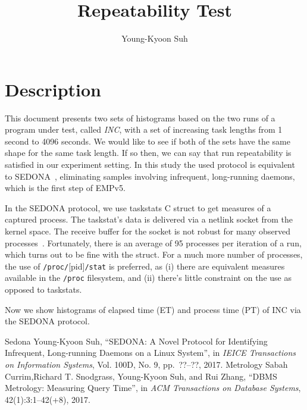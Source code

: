 \documentclass[10pt]{article}
\begin{document}
\title{Repeatability Test}

\author{
Young-Kyoon Suh\\
}
\maketitle

\section{Description}
This document presents two sets of histograms based on the two runs 
of a program under test, called {\em INC}, with a set of increasing task lengths 
from 1 second to 4096 seconds.
We would like to see if both of the sets have the same shape for the same task length.
If so then, we can say that run repeatability is satisfied in our experiment setting. 
In this study the used protocol is equivalent to SEDONA~\cite{Sedona}, 
eliminating samples involving infrequent, long-running daemons, which is the first step of EMPv5.

In the SEDONA protocol, we use taskstats C struct to get measures of a captured process. 
The taskstat's data is delivered via a netlink socket from the kernel space. 
The receive buffer for the socket is not robust for many observed processes~\cite{Metrology}. 
Fortunately, there is an average of 95 processes per iteration of a run, 
which turns out to be fine with the struct. 
For a much more number of processes, 
the use of  {\tt /proc/}[pid]{\tt{/stat}} is preferred, 
as (i) there are equivalent measures available in the {\tt /proc} filesystem, 
and (ii) there's little constraint on the use as opposed to taskstats. 

Now we show histograms of elapsed time (ET) and process time (PT) of INC via the SEDONA protocol.

\pagebreak



\pagebreak
\newpage



\pagebreak
\newpage



\pagebreak
\newpage



\pagebreak
\newpage




\newcommand{\etalchar}[1]{$^{#1}$}
\begin{thebibliography}{99}
\vspace{0.1em}
\bibitem
{Sedona}
Young-Kyoon Suh, ``SEDONA: A Novel Protocol for Identifying Infrequent, Long-running Daemons on a Linux System'', in {\em IEICE Transactions on Information Systems}, Vol. 100D, No. 9, pp.~??--??, 2017.
\vspace{0.1em}
\bibitem
{Metrology}
Sabah Currim,Richard T. Snodgrass, Young-Kyoon Suh, and Rui Zhang, ``DBMS Metrology: Measuring Query Time'', in {\em ACM Transactions on Database Systems}, 42(1):3:1--42(+8), 2017.
\end{thebibliography}
\end{document}
